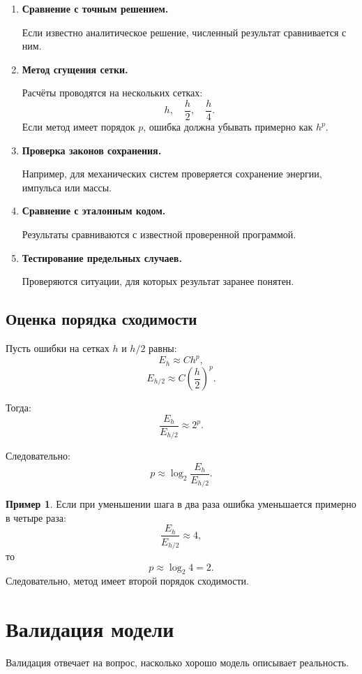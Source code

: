 \documentclass[12pt,a4paper]{article}
\theoremstyle{definition}
\newtheorem{example}{Пример}
\theoremstyle{plain}
\begin{document}
\begin{enumerate}
    \item \textbf{Сравнение с точным решением.}

    Если известно аналитическое решение, численный результат сравнивается с ним.

    \item \textbf{Метод сгущения сетки.}

    Расчёты проводятся на нескольких сетках:
    \[
    h,\quad \frac h2,\quad \frac h4.
    \]
    Если метод имеет порядок $p$, ошибка должна убывать примерно как $h^p$.

    \item \textbf{Проверка законов сохранения.}

    Например, для механических систем проверяется сохранение энергии, импульса или массы.

    \item \textbf{Сравнение с эталонным кодом.}

    Результаты сравниваются с известной проверенной программой.

    \item \textbf{Тестирование предельных случаев.}

    Проверяются ситуации, для которых результат заранее понятен.
\end{enumerate}

\subsection{Оценка порядка сходимости}

Пусть ошибки на сетках $h$ и $h/2$ равны:
\[
E_h \approx C h^p,
\]
\[
E_{h/2} \approx C\left(\frac h2\right)^p.
\]

Тогда:
\[
\frac{E_h}{E_{h/2}}
\approx
2^p.
\]

Следовательно:
\[
p \approx \log_2\frac{E_h}{E_{h/2}}.
\]

\begin{example}
Если при уменьшении шага в два раза ошибка уменьшается примерно в четыре раза:
\[
\frac{E_h}{E_{h/2}}\approx 4,
\]
то
\[
p\approx \log_2 4 = 2.
\]
Следовательно, метод имеет второй порядок сходимости.
\end{example}

\section{Валидация модели}

Валидация отвечает на вопрос, насколько хорошо модель описывает реальность.
\end{document}
